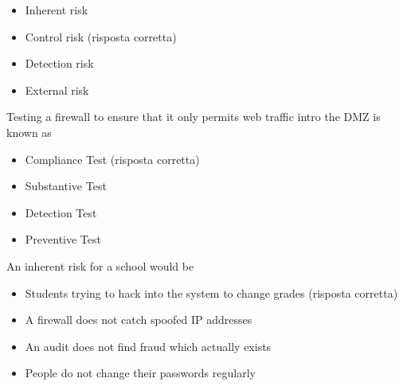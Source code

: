 \begin{itemize}
\item Inherent risk
\item Control risk (risposta corretta)
\item Detection risk
\item External risk
\end{itemize}



Testing a firewall to ensure that it only permits web traffic intro the DMZ is known as

\begin{itemize}
\item Compliance Test (risposta corretta)
\item Substantive Test
\item Detection Test
\item Preventive Test
\end{itemize}


An inherent risk for a school would be

\begin{itemize}
\item Students trying to hack into the system to change grades (risposta corretta)
\item A firewall does not catch spoofed IP addresses
\item An audit does not find fraud which actually exists
\item People do not change their passwords regularly
\end{itemize}



